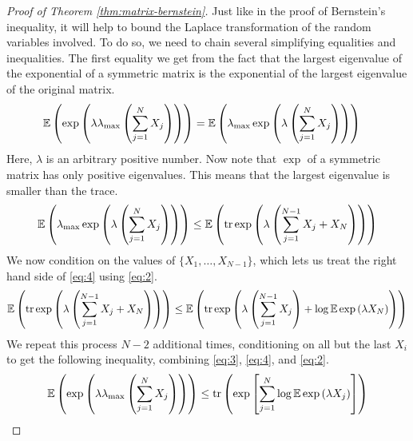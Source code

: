 \documentclass[11pt]{article}
\begin{document}
\begin{proof}[Proof of Theorem \ref{thm:matrix-bernstein}]
  Just like in the proof of Bernstein's inequality, it will help to bound the Laplace transformation of the random variables involved.
  To do so, we need to chain several simplifying equalities and inequalities.
  The first equality we get from the fact that the largest eigenvalue of the exponential of a symmetric matrix is the exponential of the largest eigenvalue of the original matrix.
  \begin{align}
    \label{eq:3}
    \mathbb{E}\left( \exp\left( \lambda \lambda_{\mathrm{max}} \left( \sum_{j=1}^N X_j \right) \right) \right)
    &= \mathbb{E}\left( \lambda_{\mathrm{max}} \exp\left( \lambda \left( \sum_{j=1}^N X_j\right) \right) \right)
  \end{align}
  Here, $\lambda$ is an arbitrary positive number.
  Now note that $\exp$ of a symmetric matrix has only positive eigenvalues.
  This means that the largest eigenvalue is smaller than the trace.
  \begin{align}
    \label{eq:4}
    \mathbb{E}\left( \lambda_{\mathrm{max}} \exp\left( \lambda \left( \sum_{j=1}^N X_j\right) \right) \right)
    \leq \mathbb{E}\left( \mathrm{tr} \exp\left( \lambda \left( \sum_{j=1}^{N-1} X_j + X_N\right) \right) \right)
  \end{align}
  We now condition on the values of $\{X_1, \ldots, X_{N-1}\}$, which lets us treat the right hand side of \eqref{eq:4} using \eqref{eq:2}.
  \begin{align*}
    \mathbb{E}\left( \mathrm{tr} \exp\left( \lambda \left( \sum_{j=1}^{N-1} X_j + X_N\right) \right) \right)
    \leq \mathbb{E}\left( \mathrm{tr} \exp\left( \lambda \left( \sum_{j=1}^{N-1} X_j \right) + \log \mathbb{E} \exp\left( \lambda X_N \right) \right) \right)
  \end{align*}
  We repeat this process $N-2$ additional times, conditioning on all but the last $X_i$ to get the following inequality, combining \eqref{eq:3}, \eqref{eq:4}, and \eqref{eq:2}.
  \begin{align}
    \label{eq:5}
    \mathbb{E}\left( \exp\left( \lambda \lambda_{\mathrm{max}} \left( \sum_{j=1}^N X_j \right) \right) \right)
    \leq \mathrm{tr}\left( \exp\left[ \sum_{j=1}^N \log \mathbb{E} \exp\left( \lambda X_j \right)\right] \right)
  \end{align}


\end{proof}
\end{document}
